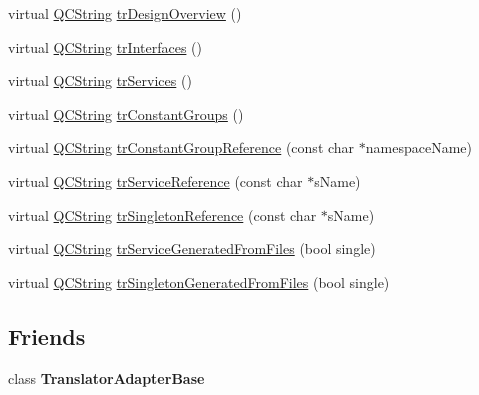 \begin{DoxyCompactItemize}
\item 
virtual \mbox{\hyperlink{class_q_c_string}{Q\+C\+String}} \mbox{\hyperlink{class_translator_korean_a8bb98b800296c28e2693e6c472ed4012}{tr\+Design\+Overview}} ()
\item 
virtual \mbox{\hyperlink{class_q_c_string}{Q\+C\+String}} \mbox{\hyperlink{class_translator_korean_a04a9331e7df2bcbcda7292d653955653}{tr\+Interfaces}} ()
\item 
virtual \mbox{\hyperlink{class_q_c_string}{Q\+C\+String}} \mbox{\hyperlink{class_translator_korean_a650db331250ec35f164e9a8c7763ca22}{tr\+Services}} ()
\item 
virtual \mbox{\hyperlink{class_q_c_string}{Q\+C\+String}} \mbox{\hyperlink{class_translator_korean_a08d1ba766aaae7466eb378aeb6b0c25b}{tr\+Constant\+Groups}} ()
\item 
virtual \mbox{\hyperlink{class_q_c_string}{Q\+C\+String}} \mbox{\hyperlink{class_translator_korean_ac4d4f3c2f52af47529424f97a923e670}{tr\+Constant\+Group\+Reference}} (const char $\ast$namespace\+Name)
\item 
virtual \mbox{\hyperlink{class_q_c_string}{Q\+C\+String}} \mbox{\hyperlink{class_translator_korean_a2d8fa72d812093e7ef7017014bba60f2}{tr\+Service\+Reference}} (const char $\ast$s\+Name)
\item 
virtual \mbox{\hyperlink{class_q_c_string}{Q\+C\+String}} \mbox{\hyperlink{class_translator_korean_abf1bc242de55e5e8b262230baa3290cd}{tr\+Singleton\+Reference}} (const char $\ast$s\+Name)
\item 
virtual \mbox{\hyperlink{class_q_c_string}{Q\+C\+String}} \mbox{\hyperlink{class_translator_korean_aedacbfa496ebf67af407c473633a9b93}{tr\+Service\+Generated\+From\+Files}} (bool single)
\item 
virtual \mbox{\hyperlink{class_q_c_string}{Q\+C\+String}} \mbox{\hyperlink{class_translator_korean_a8e7c61f844a33dda5bd8f78e3703c939}{tr\+Singleton\+Generated\+From\+Files}} (bool single)
\end{DoxyCompactItemize}
\subsection*{Friends}
\begin{DoxyCompactItemize}
\item 
\mbox{\label{class_translator_korean_a6a27329ec4f8a11907f075e9052d96f7}} 
class {\bfseries Translator\+Adapter\+Base}
\end{DoxyCompactItemize}
